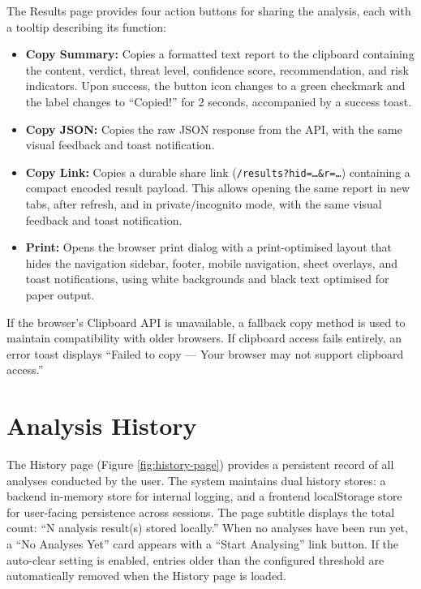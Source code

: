 The Results page provides four action buttons for sharing the analysis, each with a tooltip describing its function:
\begin{itemize}
\item \textbf{Copy Summary:} Copies a formatted text report to the clipboard containing the content, verdict, threat level, confidence score, recommendation, and risk indicators. Upon success, the button icon changes to a green checkmark and the label changes to ``Copied!'' for 2 seconds, accompanied by a success toast.
\item \textbf{Copy JSON:} Copies the raw JSON response from the API, with the same visual feedback and toast notification.
\item \textbf{Copy Link:} Copies a durable share link (\texttt{/results?hid=\ldots\&r=\ldots}) containing a compact encoded result payload. This allows opening the same report in new tabs, after refresh, and in private/incognito mode, with the same visual feedback and toast notification.
\item \textbf{Print:} Opens the browser print dialog with a print-optimised layout that hides the navigation sidebar, footer, mobile navigation, sheet overlays, and toast notifications, using white backgrounds and black text optimised for paper output.
\end{itemize}

If the browser's Clipboard API is unavailable, a fallback copy method is used to maintain compatibility with older browsers. If clipboard access fails entirely, an error toast displays ``Failed to copy --- Your browser may not support clipboard access.''

\section{Analysis History}
\label{sec:history}

The History page (Figure \ref{fig:history-page}) provides a persistent record of all analyses conducted by the user. The system maintains dual history stores: a backend in-memory store for internal logging, and a frontend localStorage store for user-facing persistence across sessions. The page subtitle displays the total count: ``N analysis result(s) stored locally.'' When no analyses have been run yet, a ``No Analyses Yet'' card appears with a ``Start Analysing'' link button. If the auto-clear setting is enabled, entries older than the configured threshold are automatically removed when the History page is loaded.

